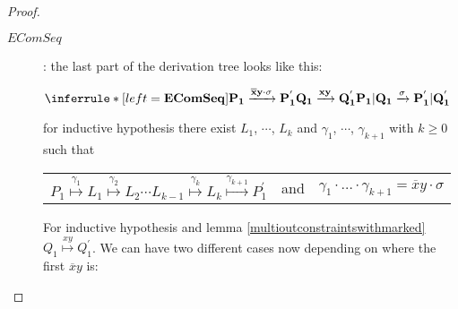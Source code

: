 \begin{proposition}
\begin{proof}
\begin{description}
      \item[$EComSeq$]: 
	the last part of the derivation tree looks like this:
	\begin{center}
	  $\inferrule* [left=\bf{EComSeq}]{
	      P_{1} \xrightarrow{\overline{x}y \cdot \sigma} P_{1}^{'}
	    \\
	      Q_{1} \xrightarrow{xy} Q_{1}^{'}
	  }{
	    P_{1}|Q_{1} \xrightarrow{\sigma} P_{1}^{'}|Q_{1}^{'}
	  }$
	\end{center}
	for inductive hypothesis there exist $L_{1}$, $\cdots$, $L_{k}$ and $\gamma_{1}$, $\cdots$, $\gamma_{k+1}$ with $k\geq 0$ such that 
	\begin{center}
	  \begin{tabular}{lll}
	    $P_{1} \stackrel{\gamma_{1}}{\longmapsto} L_{1}  \stackrel{\gamma_{2}}{\longmapsto} L_{2} \cdots L_{k-1} \stackrel{\gamma_{k}}{\longmapsto} L_{k} \stackrel{\gamma_{k+1}}{\longmapsto} P_{1}^{'}$ 
	  &
	    and
	  &
	    $\gamma_{1} \cdot \ldots \cdot \gamma_{k+1} = \overline{x}y \cdot \sigma$  
	  \end{tabular}
	\end{center}
	For inductive hypothesis and lemma \ref{multioutconstraintswithmarked} $Q_{1} \stackrel{xy}{\longmapsto} Q_{1}^{'}$. We can have two different cases now depending on where the first $\overline{x}y$ is:
\end{description}
\end{proof}
\end{proposition}
